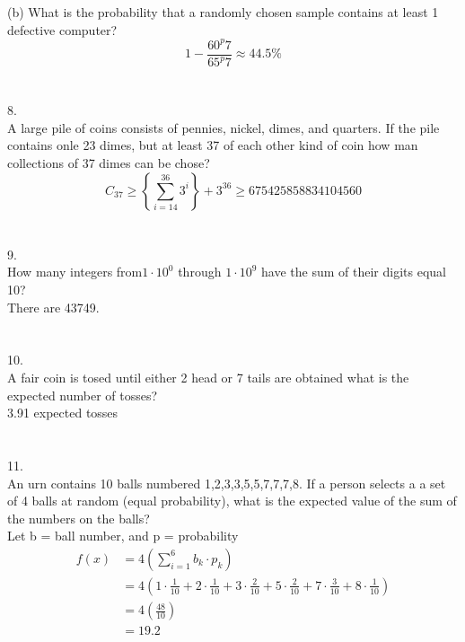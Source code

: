 \documentclass[fleqn]{article}
\begin{document}
(b) What is the probability that a randomly chosen sample contains at least 1 
defective  computer?
\begin{equation*}  
  1-\frac{60^p7}{65^p7} \approx 44.5\%
\end{equation*}
 
\section*{}
8.\\
A large pile of coins consists of pennies, nickel, dimes, and quarters. If the pile
contains onle 23 dimes, but at least 37 of each other kind of coin how man collections
of 37 dimes can be chose?
\begin{equation*}
  C_{37} \geq \left\{ \sum_{i=14}^{36}3^i \right\} + 3^{36} \geq 675425858834104560
\end{equation*}

\section*{}
9.\\
How many integers from$ 1 \cdot 10^0$ through $ 1 \cdot 10^9$ have the sum of their digits
equal 10?\\
There are 43749.

\section*{}
10.\\
A fair coin is tosed until either 2 head or 7 tails are obtained what is the expected 
number of tosses?
\\
3.91 expected tosses

\section*{}
11.\\
An urn contains 10 balls numbered 1,2,3,3,5,5,7,7,7,8. If a person selects a a set of
4 balls at random (equal probability), what is the expected value of the
sum of the numbers on the balls?\\
Let b = ball number, and p = probability \\

\begin{equation*}
  \begin{aligned}
    f\left(x  \right)&=  4 \left( \sum_{i=1}^{6}b_k \cdot p_k \right)\\ 
    &= 4\left(  1 \cdot \frac{1}{10}+2\cdot\frac{1}{10} + 3  
    \cdot \frac{2}{10} + 5 \cdot \frac{2}{10}+7\cdot\frac{3}{10}+8\cdot\frac{1}{10}\right)\\ 
    &= 4 \left( \frac{48}{10} \right)\\
    & =19.2
  \end{aligned}
\end{equation*}
\end{document}
